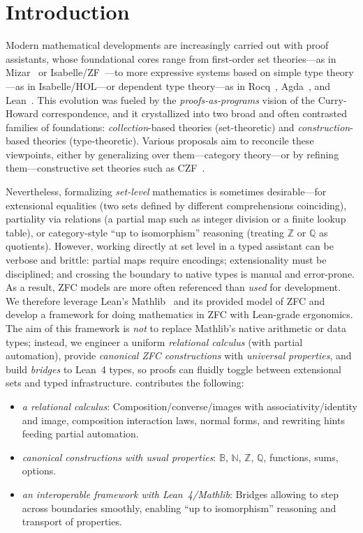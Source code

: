 \section{Introduction}
\label{sec:zflean-intro}

Modern mathematical developments are increasingly carried out with proof assistants, whose foundational cores range from first-order set theories---as in Mizar~\cite{mizar-sota} or Isabelle/ZF~\cite{paulson-zf}---to more expressive systems based on simple type theory---as in Isabelle/HOL---or dependent type theory---as in Rocq~\cite{RocqReferenceManual}, Agda~\cite{AgdaReferenceManual}, and Lean~\cite{mathlib4}.
This evolution was fueled by the \emph{proofs-as-programs} vision of the Curry-Howard correspondence, and it crystallized into two broad and often contrasted families of foundations: \emph{collection}-based theories (set-theoretic) and \emph{construction}-based theories (type-theoretic).
Various proposals aim to reconcile these viewpoints, either by generalizing over them---\eg category theory---or by refining them---\eg constructive set theories such as CZF~\cite{aczel-czf}.

Nevertheless, formalizing \emph{set-level} mathematics is sometimes desirable---for extensional equalities (two sets defined by different comprehensions coinciding), partiality via relations (a partial map such as integer division or a finite lookup table), or category-style ``up to isomorphism'' reasoning (treating $\mathbb{Z}$ or $\mathbb{Q}$ as quotients).
However, working directly at set level in a typed assistant can be verbose and brittle: partial maps require encodings; extensionality must be disciplined; and crossing the boundary to native types is manual and error-prone. As a result, ZFC models are more often referenced than \emph{used} for development.
We therefore leverage Lean's Mathlib~\cite{mathlib} and its provided model of ZFC and develop a framework for doing mathematics in ZFC with Lean-grade ergonomics.
The aim of this framework is \emph{not} to replace Mathlib's native arithmetic or data types; instead, we engineer a uniform \emph{relational calculus} (with partial automation), provide \emph{canonical ZFC constructions} with \emph{universal properties}, and build \emph{bridges} to Lean~4 types, so proofs can fluidly toggle between extensional sets and typed infrastructure.
\zflean contributes the following:
\begin{itemize}
  \item \emph{a relational calculus}: Composition/converse/images with associativity/identity and image, composition interaction laws, normal forms, and rewriting hints feeding partial automation.
  \item \emph{canonical constructions with usual properties}: $\mathbb{B}$, $\mathbb{N}$, $\mathbb{Z}$, $\mathbb{Q}$, functions, sums, options.
  \item \emph{an interoperable framework with Lean~4/Mathlib}: Bridges allowing to step across boundaries smoothly, enabling ``up to isomorphism'' reasoning and transport of properties.
\end{itemize}

